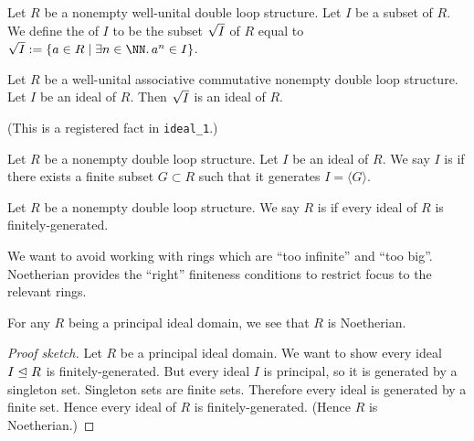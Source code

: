 \begin{definition}
Let $R$ be a nonempty well-unital double loop structure.
Let $I$ be a subset of $R$.
We define the  of $I$ to be the subset $\sqrt{I}$
of $R$ equal to $\Radical{I}:=\{a\in R\mid\exists n\in\NN\ldotp a^{n}\in I\}$.
\end{definition}

\begin{theorem}
Let $R$ be a well-unital associative commutative nonempty double loop structure.
Let $I$ be an ideal of $R$.
Then $\sqrt{I}$ is an ideal of $R$.
\end{theorem}

(This is a registered fact in \texttt{ideal\_1}.)

\begin{definition}
Let $R$ be a nonempty double loop structure.
Let $I$ be an ideal of $R$.
We say $I$ is  if there exists a finite
subset $G\subset R$ such that it generates $I=\langle G\rangle$.
\end{definition}

\begin{definition}
Let $R$ be a nonempty double loop structure.
We say $R$ is  if every ideal of $R$ is finitely-generated.
\end{definition}

\begin{remark}
We want to avoid working with rings which are ``too infinite'' and
``too big''. Noetherian provides the ``right'' finiteness conditions
to restrict focus to the relevant rings.
\end{remark}

\begin{theorem}
For any $R$ being a principal ideal domain,
we see that $R$ is Noetherian.
\end{theorem}

\begin{proof}[Proof sketch]
Let $R$ be a principal ideal domain. We want to show every ideal
$I\mathrel{\trianglelefteq} R$ is finitely-generated. But every ideal $I$ is principal,
so it is generated by a singleton set. Singleton sets are finite sets.
Therefore every ideal is generated by a finite set. Hence every ideal
of $R$ is finitely-generated. (Hence $R$ is Noetherian.)
\end{proof}


